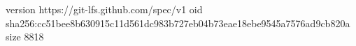version https://git-lfs.github.com/spec/v1
oid sha256:cc51bee8b630915c11d561dc983b727eb04b73eae18ebe9545a7576ad9cb820a
size 8818
